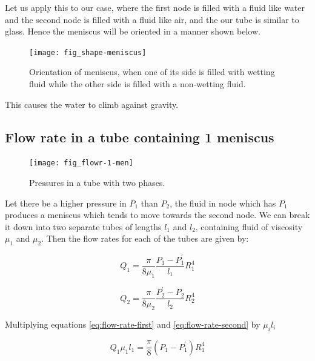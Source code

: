 	Let us apply this to our case, where the first node is filled with a fluid like water and the second node is filled with a fluid like air, and the our tube is similar to glass. Hence the meniscus will be oriented in a manner shown below.
	
	\begin{figure}[H]
		\texttt{[image: fig\_shape-meniscus]}
		\caption{Orientation of meniscus, when one of its side is filled with wetting fluid while the other side is filled with a non-wetting fluid.}
		\label{fig_shape-meniscus}
	\end{figure}
	
	This causes the water to climb against gravity.
	
	



\subsection{Flow rate in a tube containing 1 meniscus}

	\begin{figure}[H]
		\texttt{[image: fig\_flowr-1-men]}
		\caption{Pressures in a tube with two phases.}
		\label{fig_flowr-1-men}
	\end{figure}

	Let there be a higher pressure in $P_{1}$ than $P_{2}$, the fluid in node which has $P_{1}$ produces a meniscus which tends to move towards the second node. We can break it down into two separate tubes of lengths $l_{1}$ and $l_{2}$, containing fluid of viscosity ${\mu}_1$ and ${\mu}_2$. Then the flow rates for each of the tubes are given by:
	
	\begin{equation} \label{eq:flow-rate-first}
		Q_1 = \frac{\pi}{8{\mu}_1} \frac{P_1 - P^{'}_1}{l_1} R_1^4
	\end{equation}
	
	\begin{equation} \label{eq:flow-rate-second}
		Q_2 = \frac{\pi}{8{\mu}_2} \frac{P^{'}_2 - P_2}{l_2} R_2^4
	\end{equation}

	Multiplying equations \ref{eq:flow-rate-first} and \ref{eq:flow-rate-second} by ${\mu}_i l_i$
	
	\begin{equation} \label{eq:flow-rate-first-coeff}
		Q_1 {\mu}_1 l_1 = \frac{\pi}{8} (P_1 - P^{'}_1) R_1^4
	\end{equation}
	

